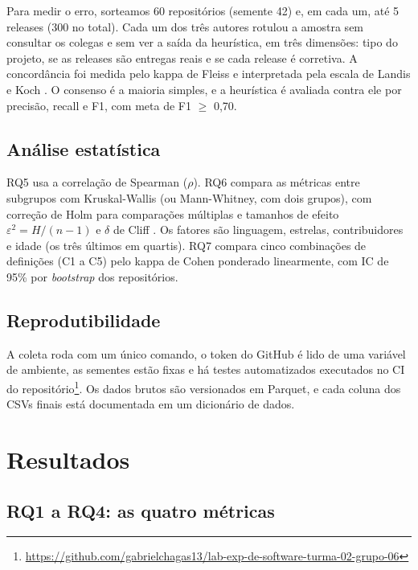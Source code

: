 \documentclass[12pt]{article}
\begin{document}
Para medir o erro, sorteamos 60 repositórios (semente 42) e, em cada um, até 5
releases (300 no total). Cada um dos três autores rotulou a amostra
sem consultar os colegas e sem ver a saída da heurística, em três
dimensões: tipo do projeto, se as releases são entregas reais e se cada release
é corretiva. A concordância foi medida pelo kappa de Fleiss e interpretada
pela escala de Landis e Koch \cite{landis:1977}. O consenso é a maioria
simples, e a heurística é avaliada contra ele por precisão, recall e F1, com
meta de F1 $\ge$ 0,70.

\subsection{Análise estatística}

RQ5 usa a correlação de Spearman ($\rho$). RQ6 compara as métricas entre
subgrupos com Kruskal-Wallis (ou Mann-Whitney, com dois grupos), com correção
de Holm para comparações múltiplas e tamanhos de efeito $\varepsilon^2 = H/(n-1)$
e $\delta$ de Cliff \cite{romano:2006}. Os fatores são linguagem, estrelas,
contribuidores e idade (os três últimos em quartis). RQ7 compara cinco
combinações de definições (C1 a C5) pelo kappa de Cohen ponderado linearmente,
com IC de 95\% por \emph{bootstrap} dos repositórios.

\subsection{Reprodutibilidade}

A coleta roda com um único comando, o token do GitHub é lido de uma variável de
ambiente, as sementes estão fixas e há testes automatizados executados no CI do
repositório\footnote{\url{https://github.com/gabrielchagas13/lab-exp-de-software-turma-02-grupo-06}}.
Os dados brutos são versionados em Parquet, e cada coluna dos CSVs finais está
documentada em um dicionário de dados.

\section{Resultados}

\subsection{RQ1 a RQ4: as quatro métricas}
\end{document}
